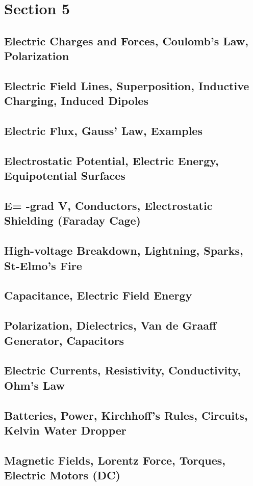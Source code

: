 \documentclass[../introphysics.tex]{subfiles}
\begin{document}
\chapter{Section 5}
\section{Electric Charges and Forces, Coulomb's Law, Polarization}
\section{Electric Field Lines, Superposition, Inductive Charging, Induced Dipoles}
\section{Electric Flux, Gauss' Law, Examples}
\section{Electrostatic Potential, Electric Energy, Equipotential Surfaces}
\section{E= -grad V, Conductors, Electrostatic Shielding (Faraday Cage)}
\section{High-voltage Breakdown, Lightning, Sparks, St-Elmo's Fire}
\section{Capacitance, Electric Field Energy}
\section{Polarization, Dielectrics, Van de Graaff Generator, Capacitors}
\section{Electric Currents, Resistivity, Conductivity, Ohm's Law}
\section{Batteries, Power, Kirchhoff's Rules, Circuits, Kelvin Water Dropper}
\section{Magnetic Fields, Lorentz Force, Torques, Electric Motors (DC)}
\end{document}
